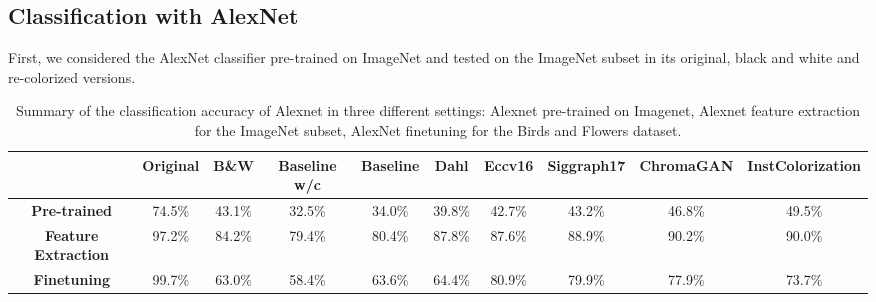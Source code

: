\subsection{Classification with AlexNet}
First, we considered the AlexNet classifier pre-trained on ImageNet and tested on the ImageNet subset in its original, black and white and re-colorized versions.

\begin{table}[ht]
	\begin{center}
		\begin{adjustwidth}{-1cm}{}
			\begin{tabular}{c|ccccccccc}
				&\textbf{Original} & \textbf{B\&W} & \textbf{Baseline w/c}&\textbf{Baseline} & \textbf{Dahl} & \textbf{Eccv16} & \textbf{Siggraph17} & \textbf{ChromaGAN} & \textbf{InstColorization}  \\
				\midrule
				\textbf{Pre-trained} & 74.5\% & 43.1\% & 32.5\% & 34.0\% & 39.8\% & 42.7\% & 43.2\% & 46.8\% & 49.5\% \\
				\midrule
				\textbf{Feature Extraction} & 97.2\% & 84.2\% & 79.4\% & 80.4\% & 87.8\% & 87.6\% &  88.9\%   &  90.2\% &       90.0\% \\
				\midrule
				\textbf{Finetuning} & 99.7\% & 63.0\% & 58.4\% & 63.6\% & 64.4\% & 80.9\% &  79.9\%   &  77.9\% &       73.7\% \\
			\end{tabular}
		\end{adjustwidth}
	\end{center}
	\caption{{\small  Summary of the classification accuracy of Alexnet in three different settings: Alexnet pre-trained on Imagenet, Alexnet feature extraction for the ImageNet subset, AlexNet finetuning for the Birds and Flowers dataset.}}
	\label{tab:pre-trained}
\end{table}

